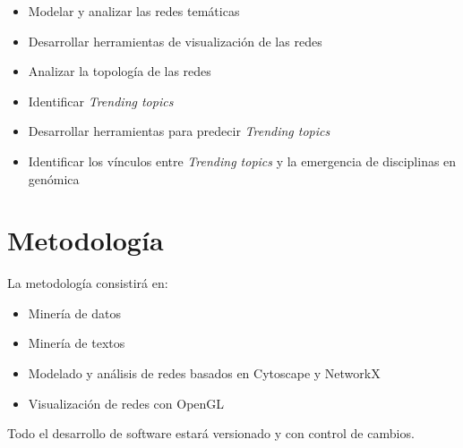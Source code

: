 \documentclass[letterpaper,12pt]{article}
\begin{document}
\begin{itemize}

\item{Modelar y analizar las redes temáticas}

\item{Desarrollar herramientas de visualización de las redes}

\item{Analizar la topología de las redes}

\item{Identificar \emph{Trending topics}}

\item{Desarrollar herramientas para predecir \emph{Trending topics}}

\item{Identificar los vínculos entre \emph{Trending topics} y la emergencia de disciplinas en genómica}

\end{itemize}

\section{Metodología}

La metodología consistirá en:

\begin{itemize}

\item{Minería de datos}

\item{Minería de textos}

\item{Modelado y análisis de redes basados en Cytoscape y NetworkX}

\item{Visualización de redes con OpenGL}

\end{itemize}

Todo el desarrollo de software estará versionado y con control de cambios.
\end{document}

